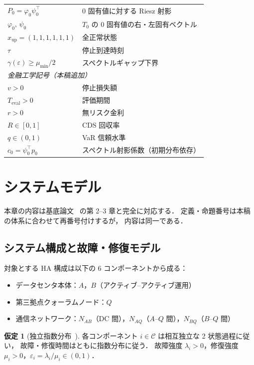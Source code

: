 \documentclass[12pt,a4paper]{article}
\theoremstyle{plain}
\theoremstyle{definition}
\newtheorem{assumption}[theorem]{仮定}
\theoremstyle{remark}
\newcommand{\calC}{\mathcal{C}}        %
\newcommand{\eps}{\varepsilon}         %
\newcommand{\Proj}{P}                  %
\begin{document}
\begin{table}[H]
\begin{tabular}{p{6.5cm}p{8cm}}
    $\Proj_0 = \varphi_0\psi_0^\top$ & 0 固有値に対する Riesz 射影 \\
    $\varphi_0,\,\psi_0$ & $T_0$ の 0 固有値の右・左固有ベクトル \\
    $x_{\mathrm{up}} = (1,1,1,1,1,1)$ & 全正常状態 \\
    $\tau$ & 停止到達時刻 \\
    $\gamma(\eps) \ge \mu_{\min}/2$ & スペクトルギャップ下界 \\
    \midrule
    \multicolumn{2}{l}{\textit{金融工学記号（本稿追加）}} \\
    \midrule
    $v > 0$ & 停止損失額 \\
    $T_{\mathrm{eval}} > 0$ & 評価期間 \\
    $r > 0$ & 無リスク金利 \\
    $R \in [0,1]$ & CDS 回収率 \\
    $q \in (0,1)$ & VaR 信頼水準 \\
    $c_0 = \psi_0^\top p_0$ & スペクトル射影係数（初期分布依存） \\
    \bottomrule
  \end{tabular}
\end{table}

\section{システムモデル}\label{sec:model}

本章の内容は基底論文~\cite{habase:v7} の第 2--3 章と完全に対応する．
定義・命題番号は本稿の体系に合わせて再番号付けするが，
内容は同一である．

\subsection{システム構成と故障・修復モデル}

対象とする HA 構成は以下の 6 コンポーネントから成る：
\begin{itemize}
  \item データセンタ本体：$A$，$B$（アクティブ–アクティブ運用）
  \item 第三拠点クォーラムノード：$Q$
  \item 通信ネットワーク：$N_{AB}$（DC 間），$N_{AQ}$（$A$–$Q$ 間），$N_{BQ}$（$B$–$Q$ 間）
\end{itemize}

\begin{assumption}[独立指数分布~{\cite{habase:v7}}]\label{ass:indep}
  各コンポーネント $i \in \calC$ は相互独立な 2 状態過程に従い，
  故障・修復時間はともに指数分布に従う．
  故障強度 $\lambda_i > 0$，修復強度 $\mu_i > 0$，$\eps_i = \lambda_i/\mu_i \in (0,1)$．
\end{assumption}
\end{document}
